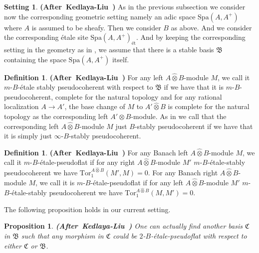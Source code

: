 \documentclass[12pt]{amsart}
\newtheorem{proposition}[theorem]{Proposition}
\theoremstyle{definition}
\newtheorem{definition}[theorem]{Definition}
\numberwithin{equation}{section}
\newtheorem{setting}[theorem]{Setting}
\begin{document}
\begin{setting} \mbox{\bf{(After Kedlaya-Liu \cite[Hypothesis 2.5.8]{KL2})}} \label{setting2.15}
As in the previous subsection we consider now the corresponding geometric setting namely an adic space $\mathrm{Spa}(A,A^+)$ where $A$ is assumed to be sheafy. Then we consider $B$ as above. And we consider the corresponding \'etale site $\mathrm{Spa}(A,A^+)_\text{\'et}$. And by keeping the corresponding setting in the geometry as in \cite[Hypothesis 2.5.8]{KL2}, we assume that there is a stable basis $\mathfrak{B}$ containing the space $\mathrm{Spa}(A,A^+)$ itself.	
\end{setting}


\begin{definition} \mbox{\bf{(After Kedlaya-Liu \cite[Definition 2.5.9]{KL2})}}
For any left $A\widehat{\otimes}B$-module $M$, we call it $m$-$B$-\'etale stably pseudocoherent with respect to $\mathfrak{B}$ if we have that it is $m$-$B$-pseudocoherent, complete for the natural topology and for any rational localization $A\rightarrow A'$, the base change of $M$ to $A'\widehat{\otimes} B$ is complete for the natural topology as the corresponding left $A'\widehat{\otimes} B$-module.	As in \cite[Definition 2.4.1]{KL2} we call that the corresponding left $A\widehat{\otimes}B$-module $M$ just $B$-stably pseudocoherent if we have that it is simply just $\infty$-$B$-stably pseudocoherent.
\end{definition}






\begin{definition}\mbox{\bf{(After Kedlaya-Liu \cite[Below Definition 2.5.9]{KL2})}}
For any Banach left $A\widehat{\otimes}B$-module $M$, we call it $m$-$B$-\'etale-pseudoflat if for any right $A\widehat{\otimes}B$-module $M'$ $m$-$B$-\'etale-stably pseudocoherent we have $\mathrm{Tor}_1^{A\widehat{\otimes}B}(M',M)=0$. For any Banach right $A\widehat{\otimes}B$-module $M$, we call it is $m$-$B$-\'etale-pseudoflat if for any left $A\widehat{\otimes}B$-module $M'$ $m$-$B$-\'etale-stably pseudocoherent we have $\mathrm{Tor}_1^{A\widehat{\otimes}B}(M,M')=0$.
\end{definition}






\indent The following proposition holds in our current setting. 


\begin{proposition} \mbox{\bf{(After Kedlaya-Liu \cite[Lemma 2.5.10]{KL2})}} \label{proposition2.18}
One can actually find another basis $\mathfrak{C}$ in $\mathfrak{B}$ such that any morphism in $\mathfrak{C}$ could be $2$-$B$-\'etale-pseudoflat with respect to either $\mathfrak{C}$ or $\mathfrak{B}$.	
\end{proposition}
\end{document}
